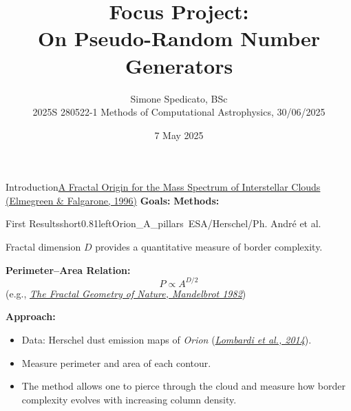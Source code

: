 \documentclass[hyperref={pdfpagelabels=false}, aspectratio=169, t]{beamer}  %
\title{Focus Project: \\ On Pseudo-Random Number Generators}											%
\subtitle{Simone Spedicato, BSc \\ 2025S 280522-1 Methods of Computational Astrophysics, 30/06/2025}                   					%
\date{7 May 2025}              									%
\begin{document}

\maketitle
											
													





\begin{textFrame}{Introduction}{}{\href{https://ui.adsabs.harvard.edu/abs/1996ApJ...471..816E/abstract}{A Fractal Origin for the Mass Spectrum of Interstellar Clouds (Elmegreen \& Falgarone, 1996)}}
	\textbf{Goals:}
	\textbf{Methods:}
\end{textFrame}


\begin{graphicsFrame}{First Results}{short}{0.81}{left}{Orion_A_pillars}{\textcopyright~ESA/Herschel/Ph. André et al.}

	Fractal dimension $D$ provides a quantitative measure of border complexity.

	\vspace{0.8em}

	\textbf{Perimeter–Area Relation:}
	\[
		P \propto A^{D/2}
	\] 
	(e.g., \href{https://ui.adsabs.harvard.edu/abs/1982mfmb.book.....M/abstract}{\textit{The Fractal Geometry of Nature, Mandelbrot 1982}})
	
	\vspace{0.8em}
	
	\textbf{Approach:}
	\begin{itemize}
		\item Data: Herschel dust emission maps of \textit{Orion} (\href{https://ui.adsabs.harvard.edu/abs/2014A&A...566A..45L/abstract}{\textit{Lombardi et al., 2014}}).
		\item Measure perimeter and area of each contour.
		\item The method allows one to pierce through the cloud and measure how border complexity evolves with increasing column density.
	\end{itemize}
\end{graphicsFrame}
\end{document}
